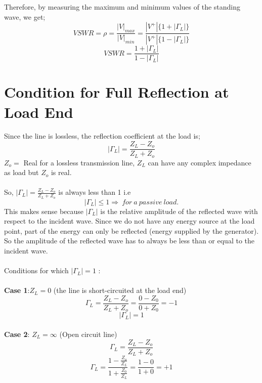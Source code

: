  Therefore, by measuring the maximum and minimum values of the standing wave, we get;
\begin{equation*}
VSWR = \rho =\frac{|V|_{max}}{|V|_{min}} = \frac{|V^+|\{1+|\Gamma_L|\}}{|V^+|\{1-|\Gamma_L|\}}
\end{equation*}
\begin{equation}
VSWR  = \frac{1+|\Gamma_L|}{1-|\Gamma_L|}	
\end{equation}
\section{Condition for Full Reflection at Load End}
Since the line is lossless, the reflection coefficient at the load is;
\begin{equation*}
|\Gamma_L| = \frac{Z_L-Z_o}{Z_L+Z_o}
\end{equation*}
$Z_o =$ Real for a lossless transmission line, $Z_L$ can have any complex impedance as load but $Z_o$ is real.\\\\
So, $	|\Gamma_L| = \frac{Z_L-Z_o}{Z_L+Z_o}$ is always less than 1 i.e
\begin{equation*}
|\Gamma_L|\leq 1\Longrightarrow \ for \ a \ passive\ load.
\end{equation*}
This makes sense because $|\Gamma_L|$ is the relative amplitude of the reflected wave with respect to the incident wave. Since we do not have any energy source at the load point, part of the energy can only be reflected (energy supplied by the generator). So the amplitude of the reflected wave has to always be less than or equal to the incident wave.\\\\
Conditions for which $|\Gamma_L|=1$ :\\\\
\textbf{Case 1}:$Z_L=0$ (the line is short-circuited at the load end)
\begin{equation*}	
\Gamma_L= \frac{Z_L -Z_o}{Z_L + Z_o} =  \frac{0 -Z_0}{0 + Z_0} = -1	
\end{equation*}
\begin{equation*}
|\Gamma_L|=1
\end{equation*}\\	
\textbf{Case 2}: $Z_L=\infty$ (Open circuit line)
\begin{equation*}
\Gamma_L= \frac{Z_L -Z_o}{Z_L + Z_o}
\end{equation*}
\begin{equation*}
\Gamma_L = \frac{1 -\frac{Z_o}{Z_L}}{1 + \frac{Z_0}{Z_L}} = \frac{1 - 0}{1 + 0} = +1
\end{equation*}
